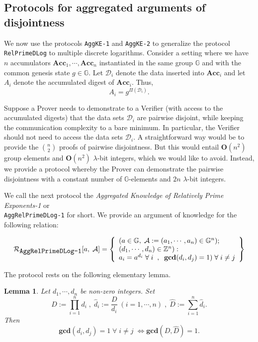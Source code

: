\documentclass[11pt, lettersize, notitlepage, leqno, footskip=0.6cm]{article}
\newcommand{\bz}{\mathbb Z}
\newcommand{\pl}{\prod\limits}
\newcommand{\slim}{\sum\limits}
\newcommand{\Acc}{\mbf{Acc}}
\newcommand{\LRA}{\Longleftrightarrow}
\newcommand{\mc}{\mathcal}
\newcommand{\mb}{\mathbb}
\newcommand{\mbf}{\mathbf}
\newcommand{\lam}{\lambda}
\newcommand{\what}{\widehat}
\newcommand{\vs}{\vspace{-0.15cm}}
\newcommand{\noin}{\noindent}
\newcommand{\GCD}{\mbf{gcd}}
\newtheorem{Lem}[Thm]{Lemma}
\numberwithin{equation}{section}
\begin{document}
\subsection{\fontsize{11}{11}\selectfont Protocols for aggregated arguments of disjointness}

We now use the protocols \verb|AggKE-1| and \verb|AggKE-2| to generalize the protocol \verb|RelPrimeDLog| to multiple discrete logarithms. Consider a setting where we have $n$ accumulators $\Acc_1,\cdots,\Acc_n$ instantiated in the same group $\mb{G}$ and with the common genesis state $g\in\mb{G}$. Let $\mc{D}_i$ denote the data inserted into $\Acc_i$ and let $A_i$ denote the accumulated digest of $\Acc_i$. Thus, \vs $$A_i = g^{\Pi(\mc{D}_i)} .$$ 

Suppose a Prover needs to demonstrate to a Verifier (with access to the accumulated digests) that the data sets $\mc{D}_i$ are pairwise disjoint, while keeping the communication complexity to a bare minimum. In particular, the Verifier should not need to access the data sets $\mc{D}_i$. A straightforward way would be to provide the $n\choose 2$ proofs of pairwise disjointness. But this would entail $\mbf{O}(n^2)$ group elements and $\mbf{O}(n^2)$ $\lam$-bit integers, which we would like to avoid. Instead, we provide a protocol whereby the Prover can demonstrate the pairwise disjointness with a constant number of $\mb{G}$-elements and $2n$ $\lam$-bit integers.

We call the next protocol the \textit{Aggregated Knowledge of Relatively Prime Exponents-1} or\\ \verb|AggRelPrimeDLog-1| for short. We provide an argument of knowledge for the following relation:

\[
  \mc{R}_{{\protect\verb|AggRelPrimeDLog-1|}}[a,\; \mc{A}] = \left\{\begin{array}{l}
    (a\in\mb{G},\;  \mc{A}:=(a_1,\cdots, a_n)\in\mb{G}^n);\\
    (d_1,\cdots,d_n)\in\bz^n): \\
    a_i = a^{d_i}\;\forall\;i\;\;,\;\; \GCD(d_i, d_j) = 1)\;\forall \;i\neq j   	
  \end{array}\right\}
\] 

\noin The protocol rests on the following elementary lemma.

\begin{Lem}\label{lcm} Let $d_1,\cdots,d_n$ be non-zero integers. Set \vs $$D:= \pl_{i=1}^n d_i\;,\; \what{d}_i:= \frac{D}{d_i}\;(i=1,\cdots,n) \;,\;\what{D}:= \slim_{i=1}^n \what{d}_i.$$ Then \vs $$\GCD(d_i,d_j)=1\;\forall\;i\neq j\; \LRA \GCD(D, \what{D}) = 1 .$$\end{Lem}
\end{document}
